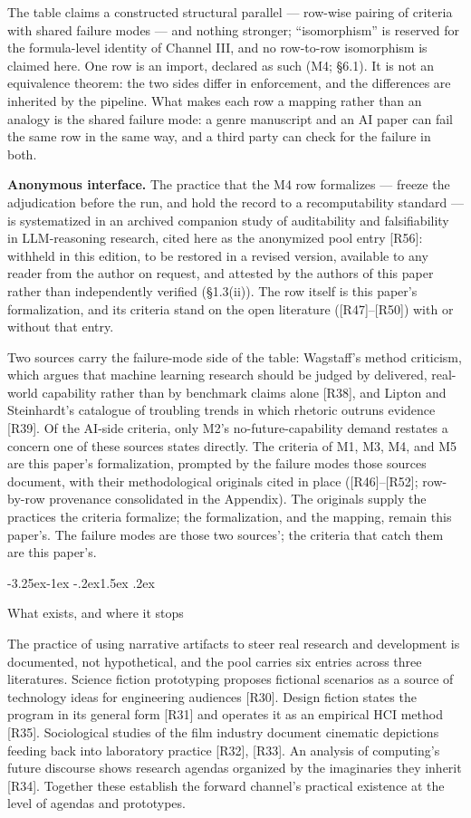 \documentclass[11pt,a4paper]{article}
\makeatletter
\renewcommand\subsection{\@startsection{subsection}{2}{\z@}%
  {-3.25ex\@plus -1ex \@minus -.2ex}{1.5ex \@plus .2ex}%
  {\normalfont\large\bfseries\raggedright}}
\makeatother
\begin{document}
The table claims a constructed structural parallel — row-wise pairing of criteria with shared failure modes — and nothing stronger; ``isomorphism'' is reserved for the formula-level identity of Channel III, and no row-to-row isomorphism is claimed here. One row is an import, declared as such (M4; §6.1). It is not an equivalence theorem: the two sides differ in enforcement, and the differences are inherited by the pipeline. What makes each row a mapping rather than an analogy is the shared failure mode: a genre manuscript and an AI paper can fail the same row in the same way, and a third party can check for the failure in both.

\textbf{Anonymous interface.} The practice that the M4 row formalizes — freeze the adjudication before the run, and hold the record to a recomputability standard — is systematized in an archived companion study of auditability and falsifiability in LLM-reasoning research, cited here as the anonymized pool entry [R56]: withheld in this edition, to be restored in a revised version, available to any reader from the author on request, and attested by the authors of this paper rather than independently verified (§1.3(ii)). The row itself is this paper's formalization, and its criteria stand on the open literature ([R47]–[R50]) with or without that entry.

Two sources carry the failure-mode side of the table: Wagstaff's method criticism, which argues that machine learning research should be judged by delivered, real-world capability rather than by benchmark claims alone [R38], and Lipton and Steinhardt's catalogue of troubling trends in which rhetoric outruns evidence [R39]. Of the AI-side criteria, only M2's no-future-capability demand restates a concern one of these sources states directly. The criteria of M1, M3, M4, and M5 are this paper's formalization, prompted by the failure modes those sources document, with their methodological originals cited in place ([R46]–[R52]; row-by-row provenance consolidated in the Appendix). The originals supply the practices the criteria formalize; the formalization, and the mapping, remain this paper's. The failure modes are those two sources'; the criteria that catch them are this paper's.

\subsection{What exists, and where it stops}

The practice of using narrative artifacts to steer real research and development is documented, not hypothetical, and the pool carries six entries across three literatures. Science fiction prototyping proposes fictional scenarios as a source of technology ideas for engineering audiences [R30]. Design fiction states the program in its general form [R31] and operates it as an empirical HCI method [R35]. Sociological studies of the film industry document cinematic depictions feeding back into laboratory practice [R32], [R33]. An analysis of computing's future discourse shows research agendas organized by the imaginaries they inherit [R34]. Together these establish the forward channel's practical existence at the level of agendas and prototypes.
\end{document}
